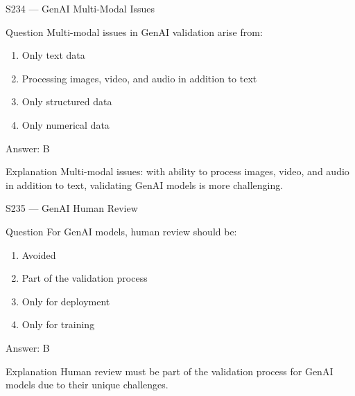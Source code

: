 \documentclass[aspectratio=169,8pt]{beamer}
\begin{document}
	\begin{frame}{S234 --- GenAI Multi-Modal Issues}
		\begin{block}{Question}
			Multi-modal issues in GenAI validation arise from:
			\begin{enumerate}
				\item Only text data
				\item Processing images, video, and audio in addition to text
				\item Only structured data
				\item Only numerical data
			\end{enumerate}
		\end{block}
		\begin{exampleblock}{Answer: B}\end{exampleblock}
		\begin{block}{Explanation}
			Multi-modal issues: with ability to process images, video, and audio in addition to text, validating GenAI models is more challenging.
		\end{block}
	\end{frame}
	
	\begin{frame}{S235 --- GenAI Human Review}
		\begin{block}{Question}
			For GenAI models, human review should be:
			\begin{enumerate}
				\item Avoided
				\item Part of the validation process
				\item Only for deployment
				\item Only for training
			\end{enumerate}
		\end{block}
		\begin{exampleblock}{Answer: B}\end{exampleblock}
		\begin{block}{Explanation}
			Human review must be part of the validation process for GenAI models due to their unique challenges.
		\end{block}
	\end{frame}
	
\end{document}
